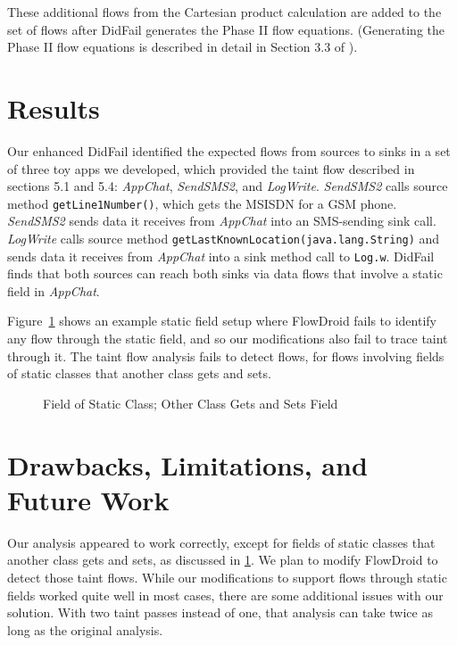 These additional flows from the Cartesian product calculation are added to the set of flows after DidFail generates the Phase II flow equations. (Generating the Phase II flow equations is described in detail in Section 3.3 of \cite{didfail}). 

\section{Results} \label{sec:static-results}
Our enhanced DidFail identified the expected flows from sources to sinks in a set of three toy apps we developed, which provided the taint flow described in sections 5.1 and 5.4: \emph{AppChat}, \emph{SendSMS2}, and \emph{LogWrite}. \emph{SendSMS2} calls source method \texttt{getLine1Number()},  which gets the MSISDN for a GSM phone.  \emph{SendSMS2} sends data it receives from \emph{AppChat} into an SMS-sending sink call. \emph{LogWrite} calls source method \texttt{getLastKnownLocation(java.lang.String)} and sends data it receives from \emph{AppChat} into a sink method call to \texttt{Log.w}. DidFail finds that both sources can reach both sinks via  data flows that involve a static field in \emph{AppChat}. 

Figure~\ref{fig:staticAnalysisProblem} shows an example static field setup where FlowDroid fails to identify any flow through the static field, and so our modifications also fail to trace taint through it.  The taint flow analysis fails to detect flows, for flows involving fields of static classes that another class gets and sets.

\begin{figure}
\begin{framed}
\begin{center}
\begin{minipage}{0.85\textwidth}

\end{minipage}
\end{center}
\caption{Field of Static Class; Other Class Gets and Sets Field}
\label{fig:staticAnalysisProblem}
\end{framed}
\end{figure}


\section{Drawbacks, Limitations, and Future Work}

Our analysis appeared to work correctly, except for fields of static classes that another class gets and sets, as discussed in \ref{sec:static-results}. We plan to modify FlowDroid to detect those taint flows. While our modifications to support flows through static fields worked quite well in most cases, there are some additional issues with our solution. With two taint passes instead of one, that analysis can take twice as long as the original analysis. 

